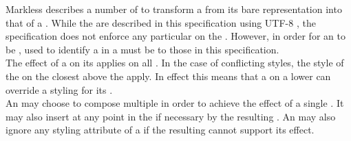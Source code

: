 Markless describes a number of  to transform a  from its bare  representation into that of a . While the  are described in this specification using UTF-8 , the specification does not enforce any particular  on the . However, in order for an  to be ,  used to identify a  in a  must be  to those in this specification. \\

The effect of a  on its  applies on all . In the case of conflicting styles, the style of the  on the closest  above the  apply. In effect this means that a  on a lower  can override a styling for its .  \\

An  may choose to compose multiple  in order to achieve the effect of a single . It may also insert  at any point in the  if necessary by the resulting . An  may also ignore any styling attribute of a  if the resulting cannot support its effect.

